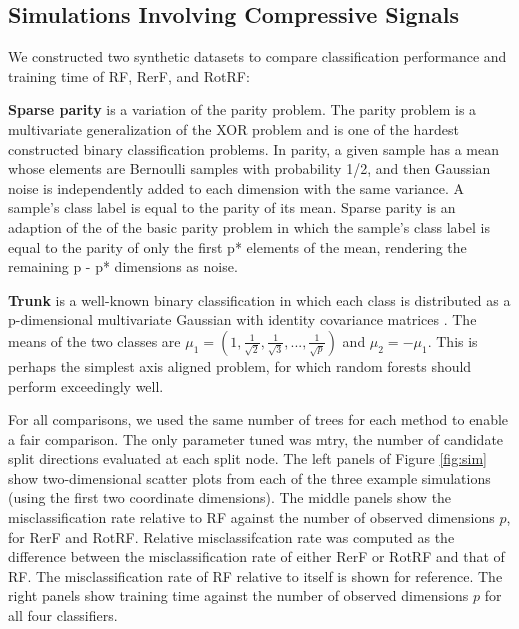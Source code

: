 \documentclass{article}
\begin{document}

\subsection{Simulations Involving Compressive Signals}

We constructed two synthetic datasets to compare classification performance and training time of RF, RerF, and RotRF:

\textbf{Sparse parity} is a variation of the parity problem. The parity problem is a multivariate generalization of the XOR problem and is one of the hardest constructed binary classification problems. In parity, a given sample has a mean whose elements are Bernoulli samples with probability 1/2, and then Gaussian noise is independently added to each dimension with the same variance.  A sample's class label is equal to the parity of its mean. Sparse parity is an adaption of the of the basic parity problem in which the sample's class label is equal to the parity of only the first p* elements of the mean, rendering the remaining p - p* dimensions as noise.

\textbf{Trunk} is a well-known binary classification in which each class is distributed as a p-dimensional multivariate Gaussian with identity covariance matrices \cite{Trunk1979}. The means of the two classes are $\mu_1 = (1,\frac{1}{\sqrt{2}},\frac{1}{\sqrt{3}},...,\frac{1}{\sqrt{p}})$ and $\mu_2 = -\mu_1$. This is perhaps the simplest axis aligned problem, for which random forests should perform exceedingly well. 

For all comparisons, we used the same number of trees for each method to enable a fair comparison. The only parameter tuned was mtry, the number of candidate split directions evaluated at each split node. The left panels of Figure \ref{fig:sim} show two-dimensional scatter plots from each of the three example simulations (using the first two coordinate dimensions). The middle panels show the misclassification rate relative to RF against the number of observed dimensions $p$, for RerF and RotRF. Relative misclassifcation rate was computed as the difference between the misclassification rate of either RerF or RotRF and that of RF. The misclassification rate of RF relative to itself is shown for reference.  The right panels show training time against the number of observed dimensions $p$ for all four classifiers.
\end{document}
